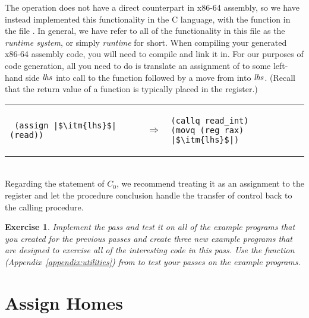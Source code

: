 \documentclass[11pt]{book}
\newtheorem{exercise}[theorem]{Exercise}
\begin{document}
The  operation does not have a direct counterpart in x86-64
assembly, so we have instead implemented this functionality in the C
language, with the function  in the file
. In general, we have refer to all of the
functionality in this file as the \emph{runtime system}, or simply
\emph{runtime} for short. When compiling your generated x86-64
assembly code, you will need to compile  and link it
in. For our purposes of code generation, all you need to do is
translate an assignment of  to some left-hand side
$\mathit{lhs}$ into call to the  function followed by a
move from  into $\mathit{lhs}$. (Recall that the return value
of a function is typically placed in the  register.)  \\
\begin{tabular}{lll}
\begin{minipage}{0.4\textwidth}
\begin{lstlisting}
 (assign |$\itm{lhs}$| (read))
\end{lstlisting}
\end{minipage}
&
$\Rightarrow$
&
\begin{minipage}{0.4\textwidth}
\begin{lstlisting}
(callq read_int)
(movq (reg rax) |$\itm{lhs}$|)
\end{lstlisting}
\end{minipage}
\end{tabular} \\

Regarding the  statement of $C_0$, we recommend treating it
as an assignment to the  register and let the procedure
conclusion handle the transfer of control back to the calling
procedure.

\begin{exercise}
\normalfont
Implement the  pass and test it on all of the
example programs that you created for the previous passes and create
three new example programs that are designed to exercise all of the
interesting code in this pass. Use the  function
(Appendix~\ref{appendix:utilities}) from  to test
your passes on the example programs.
\end{exercise}

\section{Assign Homes}
\label{sec:assign-s0}
\end{document}
